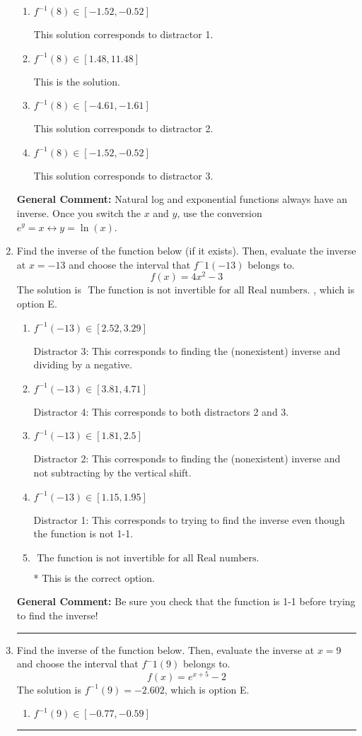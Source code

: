 \documentclass{extbook}[14pt]
\newcommand{\litem}[1]{\item #1

\rule{\textwidth}{0.4pt}}
\begin{document}
\begin{enumerate}
{\begin{enumerate}[label=\Alph*.]
 This solution corresponds to distractor 4.
\item \( f^{-1}(8) \in [-1.52, -0.52] \)

 This solution corresponds to distractor 1.
\item \( f^{-1}(8) \in [1.48, 11.48] \)

 This is the solution.
\item \( f^{-1}(8) \in [-4.61, -1.61] \)

 This solution corresponds to distractor 2.
\item \( f^{-1}(8) \in [-1.52, -0.52] \)

 This solution corresponds to distractor 3.
\end{enumerate}

\textbf{General Comment:} Natural log and exponential functions always have an inverse. Once you switch the $x$ and $y$, use the conversion $ e^y = x \leftrightarrow y=\ln(x)$.
}
\litem{
Find the inverse of the function below (if it exists). Then, evaluate the inverse at $x = -13$ and choose the interval that $f^-1(-13)$ belongs to.
\[ f(x) = 4 x^2 - 3 \]The solution is \( \text{ The function is not invertible for all Real numbers. } \), which is option E.\begin{enumerate}[label=\Alph*.]
\item \( f^{-1}(-13) \in [2.52, 3.29] \)

 Distractor 3: This corresponds to finding the (nonexistent) inverse and dividing by a negative.
\item \( f^{-1}(-13) \in [3.81, 4.71] \)

 Distractor 4: This corresponds to both distractors 2 and 3.
\item \( f^{-1}(-13) \in [1.81, 2.5] \)

 Distractor 2: This corresponds to finding the (nonexistent) inverse and not subtracting by the vertical shift.
\item \( f^{-1}(-13) \in [1.15, 1.95] \)

 Distractor 1: This corresponds to trying to find the inverse even though the function is not 1-1. 
\item \( \text{ The function is not invertible for all Real numbers. } \)

* This is the correct option.
\end{enumerate}

\textbf{General Comment:} Be sure you check that the function is 1-1 before trying to find the inverse!
}
\litem{
Find the inverse of the function below. Then, evaluate the inverse at $x = 9$ and choose the interval that $f^-1(9)$ belongs to.
\[ f(x) = e^{x+5}-2 \]The solution is \( f^{-1}(9) = -2.602 \), which is option E.\begin{enumerate}[label=\Alph*.]
\item \( f^{-1}(9) \in [-0.77, -0.59] \)


\end{enumerate}}
\end{enumerate}
\end{document}
